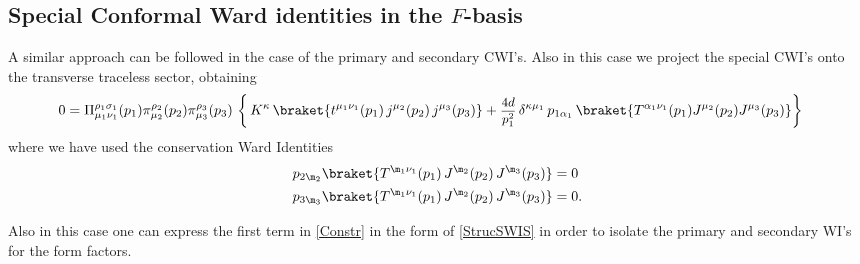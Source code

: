 \documentclass[a4paper,11pt,openright,twoside]{book}
\let\n=\nu      \let\x=\xi     \let\p=\pi      \let\r=\rho
\newcommand{\sdfrac}[2]{\mbox{\small$\displaystyle\frac{#1}{#2}$}}
\numberwithin{equation}{section}
\begin{document}
{{\subsection{Special Conformal Ward identities in the \texorpdfstring{$F$}{}-basis}
A similar approach can be followed in the case of the primary and secondary CWI's.
Also in this case we project the special CWI's onto the transverse traceless sector, obtaining
\begin{align}
	0&=\Pi^{\rho_1\sigma_1}_{\mu_1\nu_1}(p_1)\pi^{\rho_2}_{\mu_2}(p_2)\pi^{\rho_3}_{\mu_3}(p_3)\ \bigg\{\,K^\kappa\,\braket{{t^{\mu_1\nu_1}(p_1)\,j^{\mu_2}(p_2)\,j^{\mu_3}(p_3)}}+\sdfrac{4d}{p_1^2}\,\delta^{\kappa\mu_1}\,p_{1\alpha_1}\,\braket{{T^{\alpha_1\nu_1}(p_1)J^{\mu_2}(p_2)J^{\mu_3}(p_3)}}\bigg\}\label{Constr}
\end{align}
where we have used the conservation Ward Identities
\begin{subequations}
	\begin{align}
		p_{2\m_2}\braket{{T^{\m_1\n_1}(p_1)\,J^{\m_2}(p_2)\,J^{\m_3}(p_3)}}&=0 \\
		p_{3\m_3}\braket{{T^{\m_1\n_1}(p_1)\,J^{\m_2}(p_2)\,J^{\m_3}(p_3)}}&=0.
	\end{align}
\end{subequations}

Also in this case one can express the first term in \eqref{Constr} in the form of \eqref{StrucSWIS} in order to isolate the primary and secondary WI's for the form factors. 
}}
\end{document}
